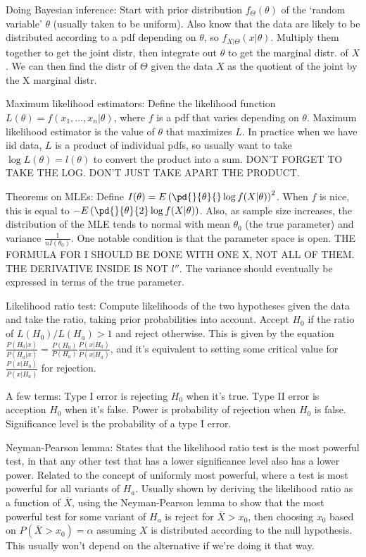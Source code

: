\documentclass{article}
\newcommand{\conj}{\overline}
\begin{document}
Doing Bayesian inference: Start with prior distribution $f_\Theta(\theta)$ of the `random variable' $\theta$ (usually taken to be uniform). Also know that the data are likely to be distributed according to a pdf depending on $\theta$, so $f_{X|\Theta}(x|\theta)$. Multiply them together to get the joint distr, then integrate out $\theta$ to get the marginal distr. of $X$. We can then find the distr of $\Theta$ given the data $X$ as the quotient of the joint by the X marginal distr.

Maximum likelihood estimators: Define the likelihood function $L(\theta)=f(x_1,\ldots,x_n|\theta)$, where $f$ is a pdf that varies depending on $\theta$. Maximum likelihood estimator is the value of $\theta$ that maximizes $L$. In practice when we have iid data, $L$ is a product of individual pdfs, so usually want to take $\log L(\theta)=l(\theta)$ to convert the product into a sum. DON'T FORGET TO TAKE THE LOG. DON'T JUST TAKE APART THE PRODUCT. 

Theorems on MLEs: Define $I(\theta)=E\left(\pd{}{\theta}{}\log f(X|\theta)\right)^2$. When $f$ is nice, this is equal to $-E\left(\pd{}{\theta}{2}\log f(X|\theta)\right)$. Also, as sample size increases, the distribution of the MLE tends to normal with mean $\theta_0$ (the true parameter) and variance $\frac{1}{nI(\theta_0)}$. One notable condition is that the parameter space is open. THE FORMULA FOR I SHOULD BE DONE WITH ONE X, NOT ALL OF THEM. THE DERIVATIVE INSIDE IS NOT $l''$. The variance should eventually be expressed in terms of the true parameter.

Likelihood ratio test: Compute likelihoods of the two hypotheses given the data and take the ratio, taking prior probabilities into account. Accept $H_0$ if the ratio of $L(H_0)/L(H_a)>1$ and reject otherwise. This is given by the equation $\frac{P(H_0|x)}{P(H_a|x)}=\frac{P(H_0)}{P(H_a)}\frac{P(x|H_0)}{P(x|H_a)}$, and it's equivalent to setting some critical value for $\frac{P(x|H_0)}{P(x|H_a)}$ for rejection.

A few terms: Type I error is rejecting $H_0$ when it's true. Type II error is acception $H_0$ when it's false. Power is probability of rejection when $H_0$ is false. Significance level is the probability of a type I error.

Neyman-Pearson lemma: States that the likelihood ratio test is the most powerful test, in that any other test that has a lower significance level also has a lower power. Related to the concept of uniformly most powerful, where a test is most powerful for all variants of $H_a$. Usually shown by deriving the likelihood ratio as a function of $\conj{X}$, using the Neyman-Pearson lemma to show that the most powerful test for some variant of $H_a$ is reject for $\conj{X}>x_0$, then choosing $x_0$ based on $P(\conj{X}>x_0)=\alpha$ assuming $X$ is distributed according to the null hypothesis. This usually won't depend on the alternative if we're doing it that way.
\end{document}
